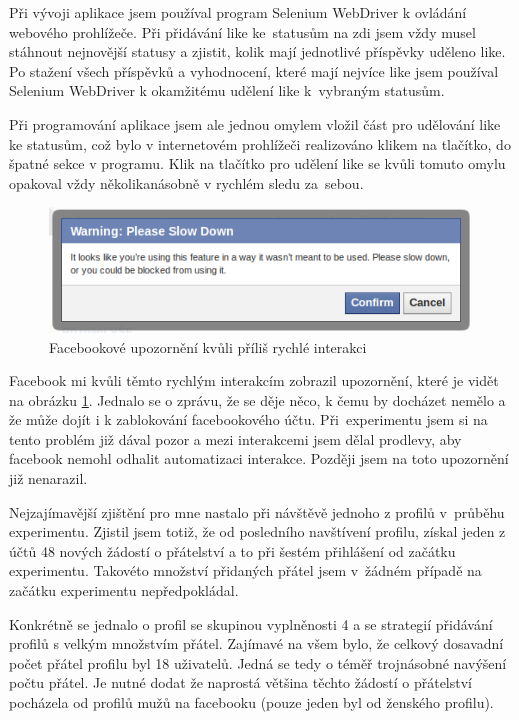 \documentclass[thesis=M,czech]{FITthesis}[2013/05/10]
\begin{document}
Při vývoji aplikace jsem používal program Selenium WebDriver k ovládání webového prohlížeče. Při přidávání like ke~statusům na zdi jsem vždy musel stáhnout nejnovější statusy a zjistit, kolik mají jednotlivé příspěvky uděleno like. Po stažení všech příspěvků a vyhodnocení, které mají nejvíce like jsem používal Selenium WebDriver k okamžitému udělení like k~vybraným statusům. 

Při programování aplikace jsem ale jednou omylem vložil část pro udělování like ke statusům, což bylo v internetovém prohlížeči realizováno klikem na tlačítko, do špatné sekce v programu. Klik na tlačítko pro udělení like se kvůli tomuto omylu opakoval vždy několikanásobně v rychlém sledu za~sebou.

\begin{figure}[h]
\begin{center}
\includegraphics[width=5in]{figures/slowDown.png}
\caption{Facebookové upozornění kvůli příliš rychlé interakci}
\label{fig:slowDown}
\end{center}
\end{figure}

Facebook mi kvůli těmto rychlým interakcím zobrazil upozornění, které je vidět na obrázku \ref{fig:slowDown}. Jednalo se o zprávu, že se děje něco, k čemu by docházet nemělo a že může dojít i k zablokování facebookového účtu. Při~experimentu jsem si na tento problém již dával pozor a mezi interakcemi jsem dělal prodlevy, aby facebook nemohl odhalit automatizaci interakce. Později jsem na toto upozornění již nenarazil.

Nejzajímavější zjištění pro mne nastalo při návštěvě jednoho z profilů v~průběhu experimentu. Zjistil jsem totiž, že od posledního navštívení profilu, získal jeden z účtů 48 nových žádostí o přátelství a to při šestém přihlášení od začátku experimentu. Takovéto množství přidaných přátel jsem v~žádném případě na začátku experimentu nepředpokládal.

Konkrétně se jednalo o profil se skupinou vyplněnosti 4 a se strategií přidávání profilů s velkým množstvím přátel. Zajímavé na všem bylo, že celkový dosavadní počet přátel profilu byl 18 uživatelů. Jedná se tedy o téměř trojnásobné navýšení počtu přátel. Je nutné dodat že naprostá většina těchto žádostí o přátelství pocházela od profilů mužů na facebooku (pouze jeden byl od ženského profilu).
\end{document}
